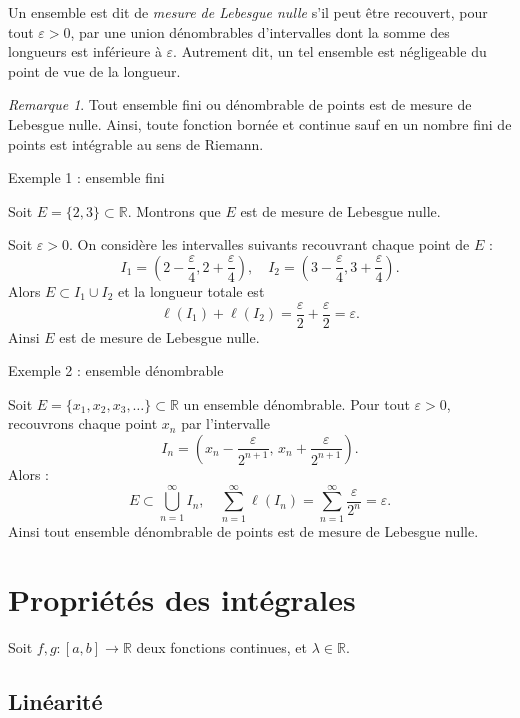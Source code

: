 \documentclass{report} %
\theoremstyle{definition}  %
\theoremstyle{plain} %
\theoremstyle{remark} %
\newtheorem*{remark}{Remarque} %
\begin{document}
\medskip
\noindent
Un ensemble est dit de \emph{mesure de Lebesgue nulle} s’il peut être recouvert,
pour tout \(\varepsilon > 0\), par une union dénombrables d’intervalles dont la somme des
longueurs est inférieure à \(\varepsilon\).
Autrement dit, un tel ensemble est négligeable du point de vue de la longueur.

\medskip
\begin{remark}
Tout ensemble fini ou dénombrable de points est de mesure de Lebesgue nulle.
Ainsi, toute fonction bornée et continue sauf en un nombre fini de points
est intégrable au sens de Riemann.
\end{remark}
\medskip
\noindent
Exemple 1 : ensemble fini

Soit \(E = \{2,3\} \subset \mathbb{R}\). Montrons que \(E\) est de mesure de Lebesgue nulle.

Soit \(\varepsilon > 0\). On considère les intervalles suivants recouvrant chaque point de \(E\) :
\[
I_1 = \left(2 - \frac{\varepsilon}{4}, 2 + \frac{\varepsilon}{4}\right), \quad
I_2 = \left(3 - \frac{\varepsilon}{4}, 3 + \frac{\varepsilon}{4}\right).
\]
Alors \(E \subset I_1 \cup I_2\) et la longueur totale est
\[
\ell(I_1) + \ell(I_2) = \frac{\varepsilon}{2} + \frac{\varepsilon}{2} = \varepsilon.
\]
Ainsi \(E\) est de mesure de Lebesgue nulle.

\medskip
\noindent
Exemple 2 : ensemble dénombrable

Soit \(E = \{x_1, x_2, x_3, \dots\} \subset \mathbb{R}\) un ensemble dénombrable.
Pour tout \(\varepsilon > 0\), recouvrons chaque point \(x_n\) par l'intervalle
\[
I_n = \left(x_n - \frac{\varepsilon}{2^{n+1}}, \, x_n + \frac{\varepsilon}{2^{n+1}}\right).
\]
Alors :
\[
E \subset \bigcup_{n=1}^{\infty} I_n, \quad 
\sum_{n=1}^{\infty} \ell(I_n) = \sum_{n=1}^{\infty} \frac{\varepsilon}{2^n} = \varepsilon.
\]
Ainsi tout ensemble dénombrable de points est de mesure de Lebesgue nulle.



\section{\textbf{Propriétés des intégrales}}

Soit \(f, g : [a,b] \to \mathbb{R}\) deux fonctions continues, et \(\lambda \in \mathbb{R}\).  

\subsection{Linéarité}
\end{document}

